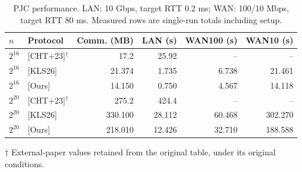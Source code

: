 \begin{table}[t]
\centering
\caption{PJC performance. LAN: 10 Gbps, target RTT 0.2 ms; WAN: 100/10 Mbps, target RTT 80 ms. Measured rows are single-run totals including setup.}
\begin{tabular}{llrrrr}
\hline
$n$ & Protocol & Comm. (MB) & LAN (s) & WAN100 (s) & WAN10 (s) \\
\hline
$2^{16}$ & [CHT+23]$^\dagger$ & 17.2 & 25.92 & -- & -- \\
$2^{16}$ & [KLS26] & 21.374 & 1.735 & 6.738 & 21.461 \\
$2^{16}$ & [Ours] & 14.150 & 0.750 & 4.567 & 14.118 \\
\hline
$2^{20}$ & [CHT+23]$^\dagger$ & 275.2 & 424.4 & -- & -- \\
$2^{20}$ & [KLS26] & 330.100 & 28.112 & 60.468 & 302.270 \\
$2^{20}$ & [Ours] & 218.010 & 12.426 & 32.710 & 188.588 \\
\hline
\end{tabular}
\par\smallskip
{\footnotesize $\dagger$ External-paper values retained from the original table, under its original conditions.}
\end{table}
